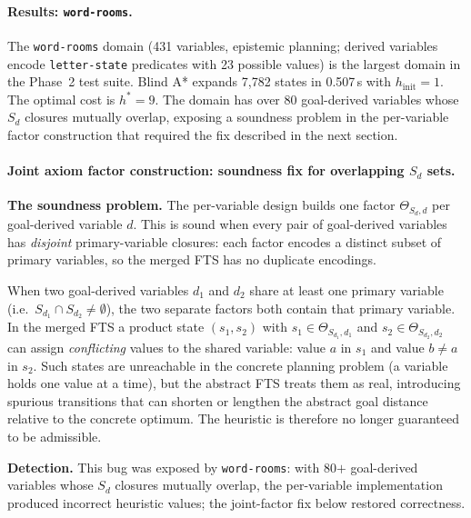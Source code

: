 \documentclass[11pt,a4paper]{article}
\begin{document}
    \paragraph{Results: \texttt{word-rooms}.}

    The \texttt{word-rooms} domain (431 variables, epistemic planning;
    derived variables encode \texttt{letter-state} predicates with 23
    possible values) is the largest domain in the Phase~2 test suite.
    Blind A* expands 7{,}782 states in 0.507\,s with $h_{\mathrm{init}} = 1$.
    The optimal cost is $h^* = 9$.  The domain has over 80 goal-derived
    variables whose $S_d$ closures mutually overlap, exposing a soundness
    problem in the per-variable factor construction that required the fix
    described in the next section.

    \paragraph{Joint axiom factor construction: soundness fix for overlapping
      $S_d$ sets.}
    \label{sec:joint-factor}

    \textbf{The soundness problem.}
    The per-variable design builds one factor $\Theta_{S_d,d}$ per
    goal-derived variable $d$.  This is sound when every pair of
    goal-derived variables has \emph{disjoint} primary-variable closures:
    each factor encodes a distinct subset of primary variables, so the
    merged FTS has no duplicate encodings.

    When two goal-derived variables $d_1$ and $d_2$ share at least one
    primary variable (i.e.\ $S_{d_1} \cap S_{d_2} \neq \emptyset$), the
    two separate factors both contain that primary variable.  In the merged
    FTS a product state $(s_1, s_2)$ with $s_1 \in \Theta_{S_{d_1},d_1}$
    and $s_2 \in \Theta_{S_{d_2},d_2}$ can assign \emph{conflicting} values
    to the shared variable: value $a$ in $s_1$ and value $b \neq a$ in
    $s_2$.  Such states are unreachable in the concrete planning problem
    (a variable holds one value at a time), but the abstract FTS treats them
    as real, introducing spurious transitions that can shorten or lengthen
    the abstract goal distance relative to the concrete optimum.  The
    heuristic is therefore no longer guaranteed to be admissible.

    \textbf{Detection.}  This bug was exposed by \texttt{word-rooms}:
    with 80$+$ goal-derived variables whose $S_d$ closures mutually
    overlap, the per-variable implementation produced incorrect heuristic
    values; the joint-factor fix below restored correctness.
\end{document}
